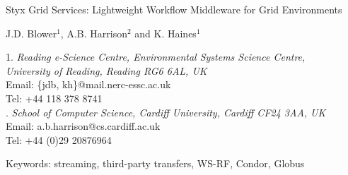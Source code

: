 \documentclass[a4paper]{article}
\begin{document}
\doublespacing

\begin{center}
{\Large Styx Grid Services: Lightweight Workflow Middleware for Grid Environments}

\bigskip
\bigskip

{\large J.D. Blower$^{1}$, A.B. Harrison$^{2}$ and K. Haines$^{1}$}

\bigskip

{\small 1. \textit{Reading e-Science Centre, Environmental Systems Science Centre, \\
University of Reading, Reading RG6 6AL, UK} \\
Email: \{jdb, kh\}@mail.nerc-essc.ac.uk\\
Tel: +44 118 378 8741 \\
. \textit{School of Computer Science, Cardiff University, Cardiff CF24 3AA, UK}\\
Email: a.b.harrison@cs.cardiff.ac.uk\\
Tel: +44 (0)29 20876964}

\bigskip
\bigskip

Keywords: streaming, third-party transfers, WS-RF, Condor, Globus

\end{center}

\newpage

\begin{abstract}
The service-oriented approach to performing distributed scientific research is potentially very powerful but is not yet widely used in many scientific fields.  This is partly due to the technical difficulties involved in creating services and composing them into workflows.  We present the Styx Grid Service, a simple system that wraps command-line programs and allows them to be run over the Internet exactly as if they were local programs.  Styx Grid Services are very easy to create and use and can be composed into powerful workflows with simple shell scripts or more sophisticated graphical tools.  Data can be streamed directly from service to service and progress can be monitored asynchronously using a mechanism that places very few demands on firewalls.  Styx Grid Services can be used as an easy-to-use, uniform interface to Condor and Globus resources, permitting the creation of workflows that span various Grid resources.  We shall show how Styx Grid Services can interoperate with Web Services and WS-Resources.
\end{abstract}
\end{document}
